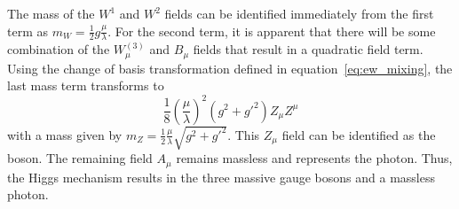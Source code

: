 The mass of the $W^1$ and $W^2$ fields can be identified immediately from the first term as $m_W=\frac{1}{2}g\frac{\mu}{\lambda}$. For the second term, it is apparent that there will be some combination of the $W_\mu^{(3)}$ and $B_\mu$ fields that result in a quadratic field term. Using the change of basis transformation defined in equation~\ref{eq:ew_mixing}, the last mass term transforms to
\begin{equation}
	\frac{1}{8}\left(\frac{\mu}{\lambda}\right)^2(g^2+g'^2)Z_\mu Z^\mu
\end{equation}
with a mass given by $m_Z=\frac{1}{2}\frac{\mu}{\lambda}\sqrt{g^2+g'^2}$. This $Z_\mu$ field can be identified as the \PZ boson. The remaining field $A_\mu$ remains massless and represents the photon. Thus, the Higgs mechanism results in the three massive gauge bosons and a massless photon.

